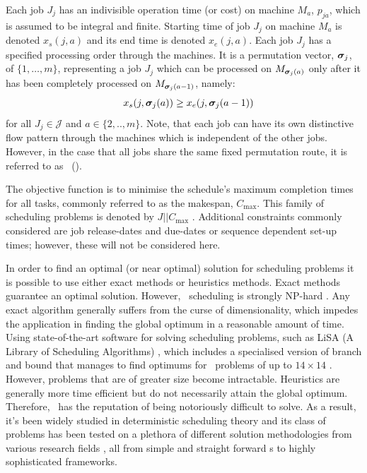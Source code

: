 \documentclass[twocolumn]{svjour3}
\begin{document}
Each job $J_j$ has an indivisible operation time (or cost) on machine $M_a$, 
$p_{ja}$, which is assumed to be integral and finite. 
Starting time of job $J_j$ on machine $M_a$ is denoted $x_s(j,a)$ and its 
end time is denoted $x_e(j,a)$. %
Each job $J_j$ has a specified processing order through the machines. It is a 
permutation vector, $\bm \sigma_j$, of $\{1,\ldots,m\}$, representing a job $J_j$ 
which can be processed on $M_{\bm \sigma_j(a)}$ only after it has been completely 
processed on $M_{\bm \sigma_j(a-1)}$, namely:
\begin{equation}\quad\label{eq:permutation}
x_s(j,\bm \sigma_j(a)) \geq x_e(j,\bm \sigma_j(a-1)) 
\end{equation}
for all $J_j\in\mathcal{J}$ and $a\in\{2,..,m\}$. 
Note, that each job can have its own distinctive flow pattern through the 
machines which is independent of the other jobs. 
However, in the case that all jobs share the same fixed permutation 
route, it is referred to as \fsp~(\FSP). 

The objective function is to minimise the schedule's maximum completion times 
for all tasks, commonly referred to as the makespan, $C_{\max}$. %
This family of scheduling problems is denoted by $J||C_{\max}$ 
\cite{Pinedo08}.
Additional constraints commonly considered are job release-dates and due-dates 
or sequence dependent set-up times; however, these will not be considered here. 

In order to find an optimal (or near optimal) solution for scheduling problems 
it is possible to use either exact methods or heuristics methods. Exact methods 
guarantee an optimal solution. However, \jsp\ scheduling is strongly NP-hard 
\cite{Garey76:NPhard}. Any exact algorithm generally suffers from the curse of 
dimensionality, which impedes the application in finding the global optimum in 
a reasonable amount of time. 
Using state-of-the-art software for solving scheduling problems, such as 
LiSA %
(A Library of Scheduling Algorithms) \cite{LiSA}, which includes a specialised 
version of branch and bound that manages to find optimums for \jsp\ problems of 
up to $14\times14$ \cite{Ru12}. However, problems that are of greater size 
become intractable. 
Heuristics are generally more time efficient but 
do not necessarily attain the global optimum. Therefore, \jsp\ has the 
reputation of being notoriously difficult to solve. 
As a result, it's been widely studied in deterministic scheduling theory and 
its class of problems has been tested on a plethora of different solution 
methodologies from various research fields \cite{Meeran12}, all from simple and 
straight forward \dr s to highly sophisticated frameworks.
\end{document}
